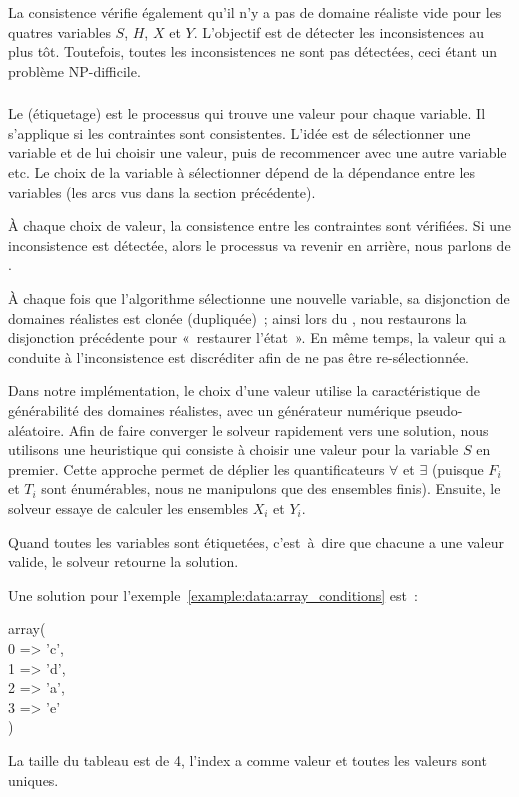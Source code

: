 La consistence vérifie également qu'il n'y a pas de domaine réaliste vide pour
les quatres variables $S$, $H$, $X$ et $Y$. L'objectif est de détecter les
inconsistences au plus tôt. Toutefois, toutes les inconsistences ne sont pas
détectées, ceci étant un problème NP-difficile.

\subsubsection{}

Le  (étiquetage) est le processus qui trouve une valeur
pour chaque variable. Il s'applique si les contraintes sont consistentes. L'idée
est de sélectionner une variable et de lui choisir une valeur, puis de
recommencer avec une autre variable etc. Le choix de la variable à sélectionner
dépend de la dépendance entre les variables (les arcs vus dans la section
précédente).

À chaque choix de valeur, la consistence entre les contraintes sont
vérifiées. Si une inconsistence est détectée, alors le processus va revenir en
arrière, nous parlons de .

À chaque fois que l'algorithme sélectionne une nouvelle variable, sa disjonction
de domaines réalistes est clonée (dupliquée)~; ainsi lors du
, nou restaurons la disjonction précédente pour
«~restaurer l'état~». En même temps, la valeur qui a conduite à l'inconsistence
est discréditer afin de ne pas être re-sélectionnée.

Dans notre implémentation, le choix d'une valeur utilise la caractéristique de
générabilité des domaines réalistes, avec un générateur numérique
pseudo-aléatoire. Afin de faire converger le solveur rapidement vers une
solution, nous utilisons une heuristique qui consiste à choisir une valeur pour
la variable $S$ en premier.  Cette approche permet de déplier les
quantificateurs $\forall$ et $\exists$ (puisque $F_i$ et $T_i$ sont énumérables,
nous ne manipulons que des ensembles finis). Ensuite, le solveur essaye de
calculer les ensembles $X_i$ et $Y_i$.

Quand toutes les variables sont étiquetées, c'est~à~dire que chacune a une
valeur valide, le solveur retourne la solution.

\begin{example}

Une solution pour l'exemple~\ref{example:data:array_conditions} est~:
%
\begin{pre}
array( \\
    0 => 'c', \\
    1 => 'd', \\
    2 => 'a', \\
    3 => 'e' \\
)
\end{pre}
%
La taille du tableau est de 4, l'index  a comme valeur  et
toutes les valeurs sont uniques.

\end{example}
